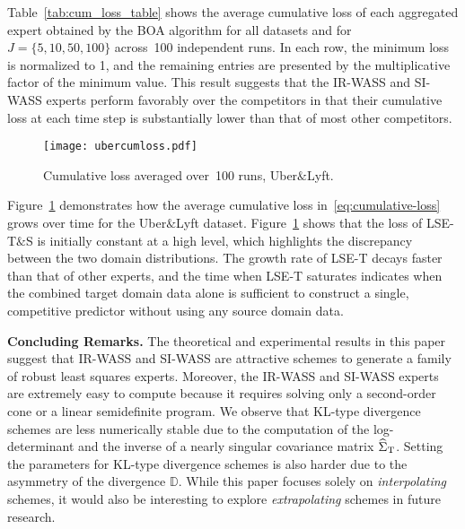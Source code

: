 \documentclass{article}
\begin{document}
    Table~\ref{tab:cum_loss_table} shows the average cumulative loss of each aggregated expert obtained by the BOA algorithm for all datasets and for~$J\! =\! \{5, 10, 50, 100\}$ across~100 independent runs.
    In each row, the minimum loss is normalized to 1, and the remaining entries are presented by the multiplicative factor of the minimum value.
    This result suggests that the IR-WASS and SI-WASS experts perform favorably over the competitors in that their cumulative loss at each time step is substantially lower than that of most other competitors.
    \begin{figure}[h!]
    \centering
    \texttt{[image: ubercumloss.pdf]}
    \vspace{-.2cm}
    \caption{Cumulative loss averaged over~100 runs, Uber$\&$Lyft.}%
    \label{fig:cumloss_plot}
    \end{figure}
    
    Figure~\ref{fig:cumloss_plot} demonstrates how the average cumulative loss in~\eqref{eq:cumulative-loss} grows over time for the Uber$\&$Lyft dataset. 
    Figure~\ref{fig:cumloss_plot} shows that the loss of LSE-T$\&$S is initially constant at a high level, which highlights the discrepancy between the two domain distributions.
    The growth rate of LSE-T decays faster than that of other experts, and the time when LSE-T saturates indicates when the combined target domain data alone is sufficient to construct a single, competitive predictor without using any source domain data.

    \textbf{Concluding Remarks.}
    The theoretical and experimental results in this paper suggest that IR-WASS and SI-WASS are attractive schemes to generate a family of robust least squares experts. Moreover, the IR-WASS and SI-WASS experts are extremely easy to compute because it requires solving only a second-order cone or a linear semidefinite program. We observe that KL-type divergence schemes are less numerically stable due to the computation of the log-determinant and the inverse of a nearly singular covariance matrix $\widehat{\Sigma}_{\rm T}$. Setting the parameters for KL-type divergence schemes is also harder due to the asymmetry of the divergence $\mathds D$. While this paper focuses solely on \textit{interpolating} schemes, it would also be interesting to explore \textit{extrapolating} schemes in future research. 
    
\end{document}
